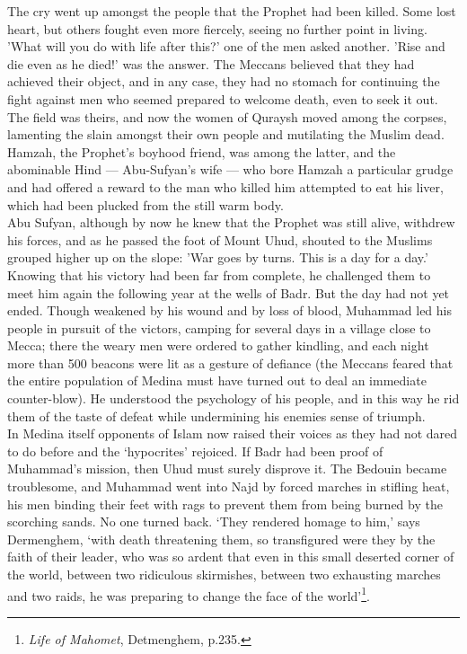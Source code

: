 \documentclass[10pt, twoside,openright]{book}
\begin{document}
The cry went up amongst the people that the Prophet had been killed. Some lost heart, but others 
fought even more fiercely, seeing no further point in living. 'What will you do with life after 
this?' one of the men asked another. 'Rise and die even as he died!' was the answer. The Meccans 
believed that they had achieved their object, and in any case, they had no stomach for continuing the 
fight against men who seemed prepared to welcome death, even to seek it out. The field was theirs, 
and now the women of Quraysh moved among the corpses, lamenting the slain amongst their own people 
and mutilating the Muslim dead. Hamzah, the Prophet's boyhood friend, was among the latter, and the 
abominable Hind --- Abu-Sufyan's wife --- who bore Hamzah a particular grudge and had offered a reward to the man who killed him attempted to eat his liver, which had been plucked from the still warm 
body. \\

Abu Sufyan, although by now he knew that the Prophet was still alive, withdrew his forces, and as he 
passed the foot of Mount Uhud, shouted to the Muslims grouped higher up on the slope: 'War goes by 
turns. This is a day for a day.' Knowing that his victory had been far from complete, he challenged 
them to meet him again the following year at the wells of Badr. But the day had not yet ended. Though 
weakened by his wound and by loss of blood, Muhammad led his people in pursuit of the victors, 
camping for several days in a village close to Mecca; there the weary men were ordered to gather 
kindling, and each night more than 500 beacons were lit as a gesture of defiance (the Meccans feared 
that the entire population of Medina must have turned out to deal an immediate counter\hyp{}blow). He 
understood the psychology of his people, and in this way he rid them of the taste of defeat while 
undermining his enemies sense of triumph. \\

In Medina itself opponents of Islam now raised their voices as they had not dared to do before and 
the `hypocrites' rejoiced. If Badr had been proof of Muhammad's mission, then Uhud must surely 
disprove it. The Bedouin became troublesome, and Muhammad went into Najd by forced marches in 
stifling heat, his men binding their feet with rags to prevent them from being burned by the 
scorching sands. No one turned back. `They rendered homage to him,' says Dermenghem, `with death 
threatening them, so transfigured were they by the faith of their leader, who was so ardent that even 
in this small deserted corner of the world, between two ridiculous skirmishes, between two exhausting 
marches and two raids, he was preparing to change the face of the world'\footnote{\emph{Life of Mahomet}, Detmenghem, p.235.}.\\
\end{document}
